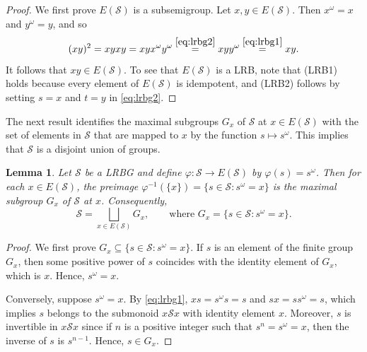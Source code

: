 \documentclass[11pt, oneside, reqno]{amsart}
\newtheorem{lemma}[theorem]{Lemma}
\theoremstyle{definition}
\numberwithin{equation}{section}
\def \SS{{\mathcal{S}}}
\begin{document}
\begin{proof}
    We first prove $E(\SS)$ is a subsemigroup.
    Let $x, y \in E(\SS)$.
    Then $x^\omega = x$ and $y^\omega = y$,
    and so
    \begin{equation*}
        (x y)^2
        = x y x y
        = x y x^\omega y^\omega
        \overset{\cref{eq:lrbg2}}{=}
        x y y^\omega
        \overset{\cref{eq:lrbg1}}{=}
        x y.
    \end{equation*}
    It follows that $x y \in E(\SS)$.
    To see that $E(\SS)$ is a LRB, note that (LRB1) holds because every element
    of $E(\SS)$ is idempotent, and (LRB2) follows by setting $s = x$ and $t
    = y$ in \cref{eq:lrbg2}.
\end{proof}

The next result identifies the maximal subgroups $G_{x}$ of $\SS$ at $x
\in E(\SS)$ with the set of elements in $\SS$ that are mapped to $x$ by the
function $s \mapsto s^\omega$. This implies that $\SS$ is a disjoint union of groups.

\begin{lemma}
    \label{preimages-of-omega-map-are-maximal-subgroups}
    Let $\SS$ be a LRBG and define $\varphi: \SS \xrightarrow{} E(\SS)$ by
    $\varphi(s) = s^\omega$.
    Then for each $x \in E(\SS)$, the preimage
    $\varphi^{-1}(\{x\}) = \{ s \in \SS : s^\omega = x \}$ is the maximal
    subgroup $G_x$ of $\SS$ at $x$.
    Consequently,
    \begin{equation}
        \label{LRBG-disjoint-union-of-groups}
        \SS = \bigsqcup_{x \in E(\SS)} G_x,
        \qquad\text{where~} G_x = \{s \in \SS: s^\omega = x\}.
    \end{equation}
\end{lemma}

\begin{proof}
    We first prove $G_x \subseteq \{s \in \SS : s^\omega = x\}$.
    If $s$ is an element of the finite group $G_x$,
    then some positive power of $s$ coincides with the
    identity element of $G_x$, which is $x$.
    Hence, $s^\omega = x$.

    Conversely, suppose $s^\omega = x$.
    By \cref{eq:lrbg1}, $x s = s^\omega s = s$ and
    $s x = s s^\omega = s$, which implies $s$
    belongs to the submonoid $x \SS x$ with identity element $x$.
    Moreover, $s$ is invertible in $x \SS x$ since if $n$ is a positive integer
    such that $s^n = s^\omega = x$, then the inverse of $s$ is $s^{n-1}$.
    Hence, $s \in G_x$.
\end{proof}
\end{document}
